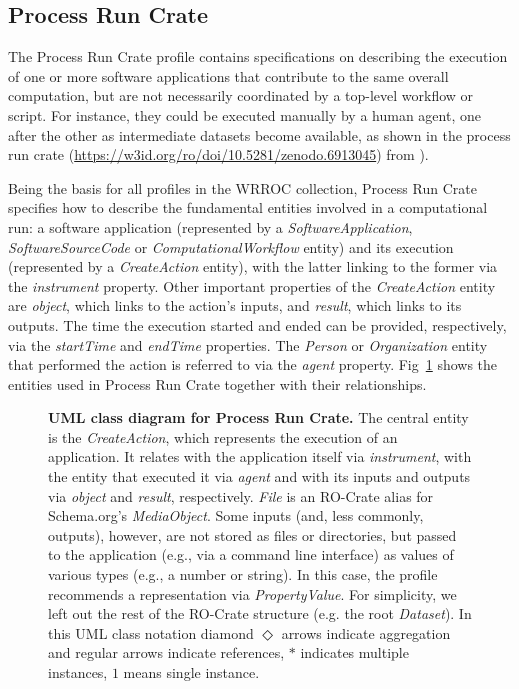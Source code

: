\documentclass[10pt,letterpaper]{article}
\begin{document}
\subsection{Process Run Crate}\label{process-run-crate}

The Process Run Crate profile \cite{WRROC 2023a} contains specifications on describing the execution of one or more software applications that contribute to the same overall computation, but are not necessarily coordinated by a top-level workflow or script.
For instance, they could be executed manually by a human agent, one after the other as intermediate datasets become available, as shown in the process run crate (\url{https://w3id.org/ro/doi/10.5281/zenodo.6913045}) from \cite{Meurisse 2023}).

Being the basis for all profiles in the WRROC collection, Process Run Crate specifies how to describe the fundamental entities involved in a computational run: a software application (represented by a
\emph{SoftwareApplication}, \emph{SoftwareSourceCode} or
\emph{ComputationalWorkflow} entity) and its execution (represented by a \emph{CreateAction} entity), with the latter linking to the former via the \emph{instrument} property.
Other important properties of the
\emph{CreateAction} entity are \emph{object}, which links to the action's inputs, and \emph{result}, which links to its outputs.
The time the execution started and ended can be provided, respectively, via the
\emph{startTime} and \emph{endTime} properties.
The \emph{Person} or
\emph{Organization} entity that performed the action is referred to via the \emph{agent} property.
Fig~\ref{fig:process_crate_er} shows the entities used in Process Run Crate together with their relationships.

\begin{figure}[!h]
\caption{{\bf UML class diagram for Process Run Crate.}
The central entity is the \emph{CreateAction}, which represents the execution of an application.
It relates with the application itself via \emph{instrument}, with the entity that executed it via \emph{agent} and with its inputs and outputs via \emph{object}
and \emph{result}, respectively. 
\emph{File} is an RO-Crate alias for Schema.org's \emph{MediaObject}.
Some inputs (and, less commonly, outputs), however, are not stored as files or directories, but passed to the application (e.g., via a command line interface) as values of various types (e.g., a number or string). In this case, the profile recommends a representation via \emph{PropertyValue}. 
For simplicity, we left out the rest of the RO-Crate structure (e.g. the root \emph{Dataset}). In this UML class notation diamond $\Diamond$ arrows indicate aggregation and regular arrows indicate references, $*$ indicates multiple instances, $1$ means single instance.  
}
\label{fig:process_crate_er}
\end{figure}
\end{document}
